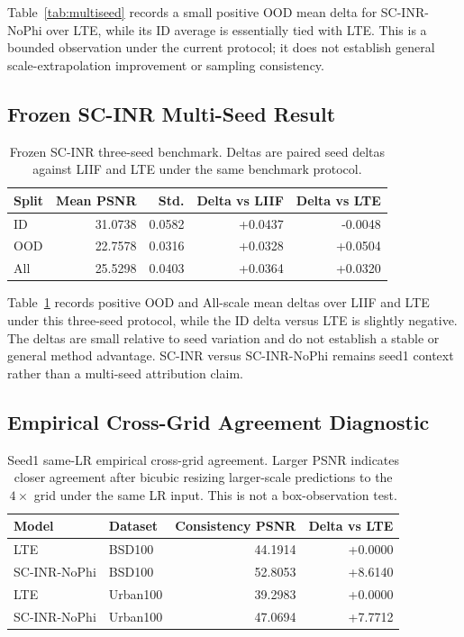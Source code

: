 \documentclass[10pt]{article}
\begin{document}
Table~\ref{tab:multiseed} records a small positive OOD mean delta for
SC-INR-NoPhi over LTE, while its ID average is essentially tied with LTE. This
is a bounded observation under the current protocol; it does not establish
general scale-extrapolation improvement or sampling consistency.

\subsection{Frozen SC-INR Multi-Seed Result}

\begin{table}[H]
\centering
\caption{Frozen SC-INR three-seed benchmark. Deltas are paired seed
deltas against LIIF and LTE under the same benchmark protocol.}
\label{tab:final-multiseed}
\begin{tabular}{lrrrr}
\toprule
Split & Mean PSNR & Std. & Delta vs LIIF & Delta vs LTE \\
\midrule
ID & 31.0738 & 0.0582 & +0.0437 & -0.0048 \\
OOD & 22.7578 & 0.0316 & +0.0328 & +0.0504 \\
All & 25.5298 & 0.0403 & +0.0364 & +0.0320 \\
\bottomrule
\end{tabular}
\end{table}

Table~\ref{tab:final-multiseed} records positive OOD and All-scale mean deltas
over LIIF and LTE under this three-seed protocol, while the ID delta versus LTE
is slightly negative. The deltas are small relative to seed variation and do
not establish a stable or general method advantage. SC-INR versus SC-INR-NoPhi
remains seed1 context rather than a multi-seed attribution claim.

\subsection{Empirical Cross-Grid Agreement Diagnostic}

\begin{table}[H]
\centering
\caption{Seed1 same-LR empirical cross-grid agreement. Larger PSNR indicates
closer agreement after bicubic resizing larger-scale predictions to the
\(4\times\) grid under the same LR input. This is not a box-observation test.}
\label{tab:consistency}
\begin{tabular}{llrr}
\toprule
Model & Dataset & Consistency PSNR & Delta vs LTE \\
\midrule
LTE & BSD100 & 44.1914 & +0.0000 \\
SC-INR-NoPhi & BSD100 & 52.8053 & +8.6140 \\
LTE & Urban100 & 39.2983 & +0.0000 \\
SC-INR-NoPhi & Urban100 & 47.0694 & +7.7712 \\
\bottomrule
\end{tabular}
\end{table}
\end{document}
